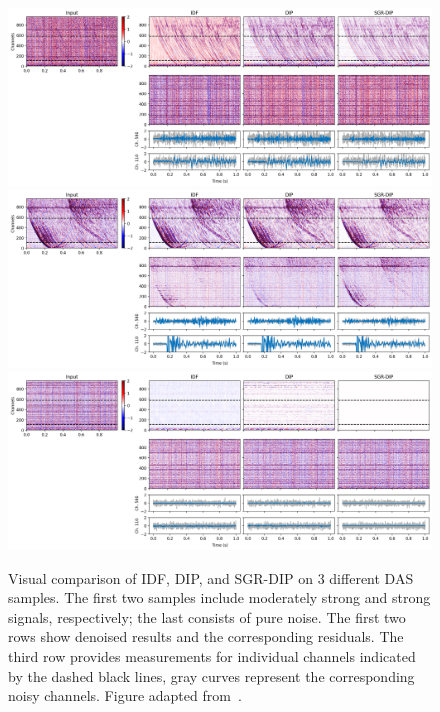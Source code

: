 \begin{figure}
    \centering
    \includegraphics[width=\textwidth]{img/fig_6.4_1.png}\\
    \vspace{10pt}
    \includegraphics[width=\textwidth]{img/fig_6.4_2.png}\\
    \vspace{10pt}
    \includegraphics[width=\textwidth]{img/fig_6.4_3.png}
    \caption{
        Visual comparison of IDF, DIP, and SGR-DIP on 3 different DAS samples.
        The first two samples include moderately strong and strong signals, respectively; the last consists of pure noise.
        The first two rows show denoised results and the corresponding residuals.
        The third row provides measurements for individual channels indicated by the dashed black lines, gray curves represent the corresponding noisy channels.
        Figure adapted from~\cite{DAS-CN2S}.
    }\label{fig:FORGE}
\end{figure}


